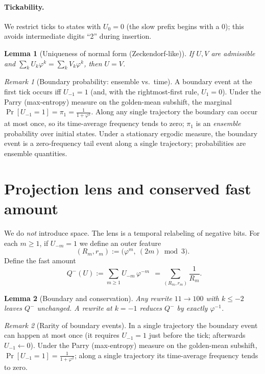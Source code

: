 \documentclass[11pt]{article}
\newtheorem{lemma}{Lemma}
\theoremstyle{remark}
\newtheorem{remark}{Remark}
\newcommand{\bb}[1]{\boxed{\;#1\;}}
\begin{document}
\paragraph{Tickability.}
We restrict ticks to states with $U_0=0$ (the slow prefix begins with a $0$); this avoids intermediate digits ``2'' during insertion.


\begin{lemma}[Uniqueness of normal form (Zeckendorf-like)]\label{lem:uniq}
If $U,V$ are admissible and $\sum_k U_k\varphi^k=\sum_k V_k\varphi^k$, then $U=V$.
\end{lemma}

\begin{remark}[Boundary probability: ensemble vs.\ time]\label{rem:boundary-prob}
A boundary event at the first tick occurs iff $U_{-1}=1$ (and, with the rightmost-first rule, $U_1=0$).
Under the Parry (max-entropy) measure on the golden-mean subshift, the marginal $\Pr[U_{-1}=1]=\pi_1=\frac{1}{1+\varphi^2}$.
Along any single trajectory the boundary can occur at most once, so its time-average frequency tends to zero; $\pi_1$ is an \emph{ensemble} probability over initial states.
Under a stationary ergodic measure, the boundary event is a zero‑frequency tail event along a single trajectory; probabilities are ensemble quantities.
\end{remark}


\section{Projection lens and conserved fast amount}\label{sec:proj}
We do \emph{not} introduce space. The lens is a temporal relabeling of negative bits.
For each $m\ge1$, if $U_{-m}=1$ we define an outer feature
\begin{equation}\label{proj}
(R_m,r_m):=\big(\varphi^{m},\ (2m)\bmod 3\big).
\end{equation}
Define the fast amount
\begin{equation}\label{Qminus}
\bb{\,Q^-(U):=\sum_{m\ge1} U_{-m}\,\varphi^{-m}\,}=\sum_{(R_m,r_m)}\frac{1}{R_m}.
\end{equation}

\begin{lemma}[Boundary and conservation]\label{lem:boundary}
Any rewrite $11\!\to\!100$ with $k\le -2$ leaves $Q^-$ unchanged.
A rewrite at $k=-1$ reduces $Q^-$ by exactly $\varphi^{-1}$.
\end{lemma}

\begin{remark}[Rarity of boundary events]
In a single trajectory the boundary event can happen at most once (it requires $U_{-1}=1$ just before the tick; afterwards $U_{-1}\leftarrow 0$).
Under the Parry (max-entropy) measure on the golden-mean subshift, $\Pr[U_{-1}=1]=\frac{1}{1+\varphi^2}$; along a single trajectory its time-average frequency tends to zero.
\end{remark}
\end{document}

